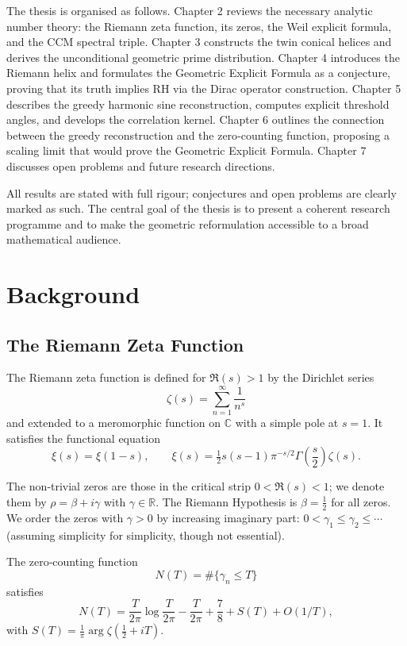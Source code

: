 \documentclass[12pt,a4paper,oneside]{book}
\newcommand{\R}{\mathbb{R}}
\newcommand{\C}{\mathbb{C}}
\begin{document}
The thesis is organised as follows.  Chapter 2 reviews the necessary analytic number theory: the Riemann zeta function, its zeros, the Weil explicit formula, and the CCM spectral triple.  Chapter 3 constructs the twin conical helices and derives the unconditional geometric prime distribution.  Chapter 4 introduces the Riemann helix and formulates the Geometric Explicit Formula as a conjecture, proving that its truth implies RH via the Dirac operator construction.  Chapter 5 describes the greedy harmonic sine reconstruction, computes explicit threshold angles, and develops the correlation kernel.  Chapter 6 outlines the connection between the greedy reconstruction and the zero‑counting function, proposing a scaling limit that would prove the Geometric Explicit Formula.  Chapter 7 discusses open problems and future research directions.

All results are stated with full rigour; conjectures and open problems are clearly marked as such.  The central goal of the thesis is to present a coherent research programme and to make the geometric reformulation accessible to a broad mathematical audience.

\chapter{Background}

\section{The Riemann Zeta Function}

The Riemann zeta function is defined for \(\Re(s)>1\) by the Dirichlet series
\[
\zeta(s) = \sum_{n=1}^{\infty} \frac{1}{n^{s}}
\]
and extended to a meromorphic function on \(\C\) with a simple pole at \(s=1\).  It satisfies the functional equation
\[
\xi(s) = \xi(1-s),\qquad
\xi(s) = \tfrac12 s(s-1)\pi^{-s/2}\Gamma\!\left(\frac{s}{2}\right)\zeta(s).
\]

The non‑trivial zeros are those in the critical strip \(0<\Re(s)<1\); we denote them by \(\rho=\beta+i\gamma\) with \(\gamma\in\R\).  The Riemann Hypothesis is \(\beta=\frac12\) for all zeros.  We order the zeros with \(\gamma>0\) by increasing imaginary part: \(0<\gamma_1\le \gamma_2\le\cdots\) (assuming simplicity for simplicity, though not essential).

The zero‑counting function
\[
N(T) = \#\{\gamma_n \le T\}
\]
satisfies
\[
N(T) = \frac{T}{2\pi}\log\frac{T}{2\pi} - \frac{T}{2\pi} + \frac{7}{8} + S(T) + O(1/T),
\]
with \(S(T)=\frac1\pi\arg\zeta(\frac12+iT)\).
\end{document}
